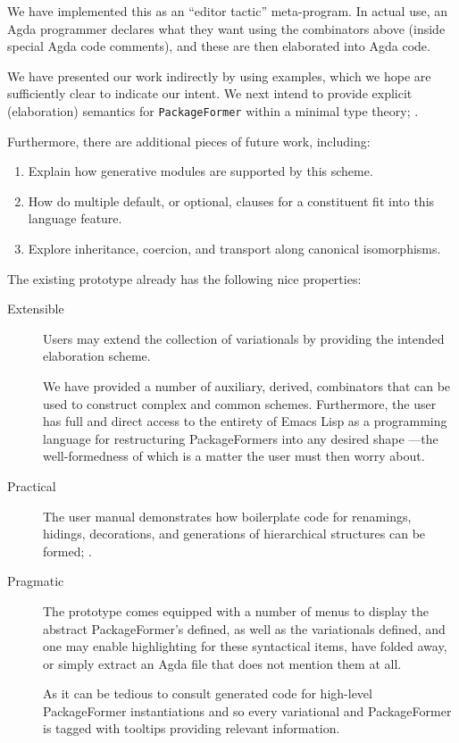 \documentclass[sigplan,screen]{acmart}
\begin{document}
We have implemented this as an “editor tactic'' meta-program.
In actual use, an Agda programmer declares what they want
using the combinators above (inside special Agda code comments),
and these are then elaborated into Agda code.

We have presented our work indirectly by using examples, which we
hope are sufficiently clear to indicate our intent. We next intend to
provide explicit (elaboration) semantics for \texttt{PackageFormer} within a
minimal type theory; \newline \cite{types_for_modules}.

Furthermore, there are additional pieces of future work, including:

\begin{enumerate}
\item Explain how generative modules \cite{modular_modules}
are supported by this scheme.

\item How do multiple default, or optional, clauses for a constituent fit into this
language feature.

\item Explore inheritance, coercion, and transport along canonical isomorphisms.
\end{enumerate}

The existing prototype already has the following nice properties:

\begin{description}
\item[{Extensible}] Users may extend the collection of variationals by providing the intended
elaboration scheme.

We have provided a number of auxiliary, derived, combinators
that can be used to construct complex and common schemes.
Furthermore, the user has full and direct access to the entirety of Emacs Lisp
as a programming language for restructuring PackageFormers into any desired shape
---the well-formedness of which is a matter the user must then worry about.

\item[{Practical}] The user manual demonstrates how boilerplate code for
            renamings, hidings, decorations, and generations
of hierarchical structures can be formed; \newline
\cite{tpc}.

\item[{Pragmatic}] The prototype comes equipped with a number of menus
to display the abstract PackageFormer's defined,
as well as the variationals defined, and one may
enable highlighting for these syntactical items, have
folded away, or simply extract an Agda file that does not mention
them at all.

As it can be tedious to consult generated code for high-level
PackageFormer instantiations and so every variational and PackageFormer
is tagged with tooltips providing relevant information.
\end{description}
\end{document}
